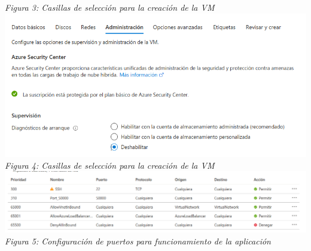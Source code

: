 \documentclass[10pt,executivepaper]{article}
\begin{document}
\begin{center}
  \textit{Figura 3: Casillas de selección para la creación de la VM}\\
  \includegraphics[scale=0.5]{imgs/creacion_4.png}\\
  \textit{Figura 4: Casillas de selección para la creación de la VM}\\
  \includegraphics[scale=0.4]{imgs/config_net.png}\\
  \textit{Figura 5: Configuración de puertos para funcionamiento de la aplicación}
\end{center}
\end{document}
